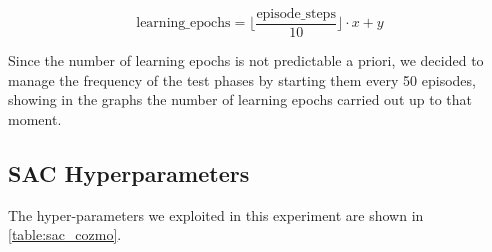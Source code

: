 \begin{equation}
    \label{eq:learning-step}
    \text{learning\_epochs} = \bigg\lfloor\frac{\text{episode\_steps}}{10}\bigg\rfloor \cdot x + y
\end{equation}

Since the number of learning epochs is not predictable a priori, we decided to manage the frequency of the test phases by starting them every 50 episodes, showing in the graphs the number of learning epochs carried out up to that moment.



\subsection{SAC Hyperparameters}

The hyper-parameters we exploited in this experiment are shown in \vref{table:sac_cozmo}.

